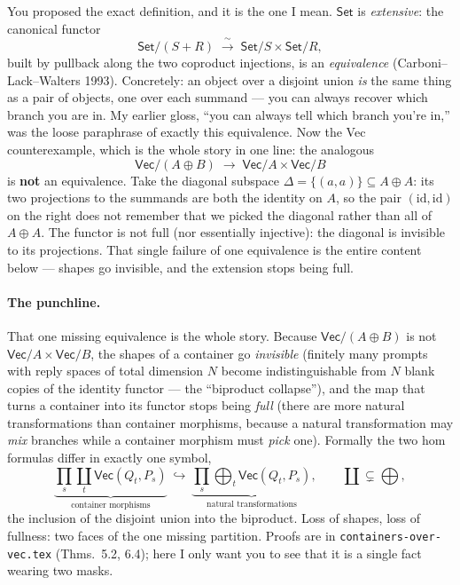 \documentclass[11pt]{article}
\providecommand{\Vec}{}\renewcommand{\Vec}{\mathsf{Vec}}
\newcommand{\Set}{\mathsf{Set}}
\begin{document}
\begin{description}[leftmargin=1.3em,style=nextline]
\item[(C) What $\Vec$ \emph{lacks}: extensivity.] You proposed the exact definition,
  and it is the one I mean. $\Set$ is \emph{extensive}: the canonical functor
  \[
    \Set/(S+R)\;\xrightarrow{\ \sim\ }\;\Set/S \times \Set/R,
  \]
  built by pullback along the two coproduct injections, is an \emph{equivalence}
  (Carboni--Lack--Walters 1993). Concretely: an object over a disjoint union
  \emph{is} the same thing as a pair of objects, one over each summand --- you can
  always recover which branch you are in. My earlier gloss, ``you can always tell which
  branch you're in,'' was the loose paraphrase of exactly this equivalence. Now the
  Vec counterexample, which is the whole story in one line: the analogous
  \[
    \Vec/(A\oplus B)\;\longrightarrow\;\Vec/A \times \Vec/B
  \]
  is \textbf{not} an equivalence. Take the diagonal subspace
  $\Delta=\{(a,a)\}\subseteq A\oplus A$: its two projections to the summands are both
  the identity on $A$, so the pair $(\text{id},\text{id})$ on the right does not
  remember that we picked the diagonal rather than all of $A\oplus A$. The functor is
  not full (nor essentially injective): the diagonal is invisible to its projections.
  That single failure of one equivalence is the entire content below --- shapes go
  invisible, and the extension stops being full.
\end{description}

\paragraph{The punchline.}
That one missing equivalence is the whole story. Because $\Vec/(A\oplus B)$ is not
$\Vec/A\times\Vec/B$, the shapes of a container go \emph{invisible} (finitely many
prompts with reply spaces of total dimension $N$ become indistinguishable from $N$
blank copies of the identity functor --- the ``biproduct collapse''), and the map
that turns a container into its functor stops being \emph{full} (there are more
natural transformations than container morphisms, because a natural transformation may
\emph{mix} branches while a container morphism must \emph{pick} one). Formally the two
hom formulas differ in exactly one symbol,
\[
  \underbrace{\textstyle\prod_s \coprod_t \Vec(Q_t,P_s)}_{\text{container morphisms}}
  \ \hookrightarrow\
  \underbrace{\textstyle\prod_s \bigoplus_t \Vec(Q_t,P_s)}_{\text{natural transformations}},
  \qquad \coprod \subsetneq \bigoplus,
\]
the inclusion of the disjoint union into the biproduct. Loss of shapes, loss of
fullness: two faces of the one missing partition. Proofs are in
\texttt{containers-over-vec.tex} (Thms.\ 5.2, 6.4); here I only want you to see that it
is a single fact wearing two masks.
\end{document}
